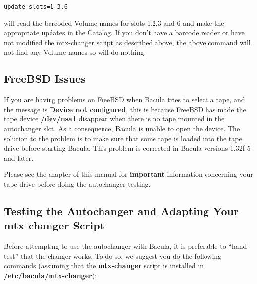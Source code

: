 \footnotesize
\begin{verbatim}
update slots=1-3,6
\end{verbatim}
\normalsize

will read the barcoded Volume names for slots 1,2,3 and 6 and make the
appropriate updates in the Catalog. If you don't have a barcode reader or have
not modified the mtx-changer script as described above, the above command will
not find any Volume names so will do nothing. 
\label{FreeBSD}

\subsection*{FreeBSD Issues}

If you are having problems on FreeBSD when Bacula tries to select a tape, and
the message is {\bf Device not configured}, this is because FreeBSD has made
the tape device {\bf /dev/nsa1} disappear when there is no tape mounted in the
autochanger slot. As a consequence, Bacula is unable to open the device. The
solution to the problem is to make sure that some tape is loaded into the tape
drive before starting Bacula. This problem is corrected in Bacula versions
1.32f-5 and later. 

Please see the 
 chapter of this manual for
{\bf important} information concerning your tape drive before doing the
autochanger testing. 
\label{AutochangerTesting}

\subsection*{Testing the Autochanger and Adapting Your mtx-changer Script}

Before attempting to use the autochanger with Bacula, it is preferable to
``hand-test'' that the changer works. To do so, we suggest you do the
following commands (assuming that the {\bf mtx-changer} script is installed in
{\bf /etc/bacula/mtx-changer}): 

